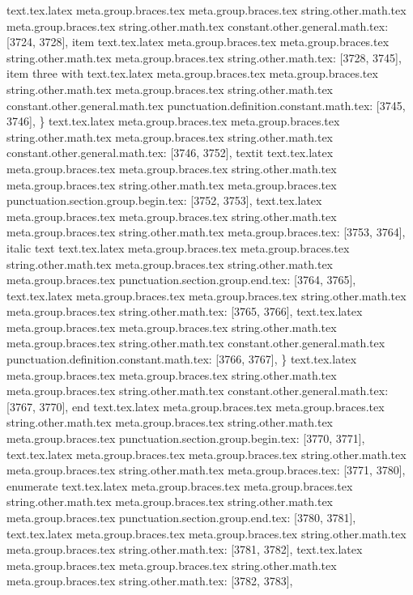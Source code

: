 {{{{{{{{{{{{{{{{{{{{{{{{{{{{{{{{{{{{{{{{{{{{{{{{{{{{{{{{{{{{{{{{{{{{{{{{{{{{{{{{{{{{{{{{{{{{{{{{{{{{{{{{{{{{{{{{{{{{{{text.tex.latex meta.group.braces.tex meta.group.braces.tex string.other.math.tex meta.group.braces.tex string.other.math.tex constant.other.general.math.tex: [3724, 3728], {item}
text.tex.latex meta.group.braces.tex meta.group.braces.tex string.other.math.tex meta.group.braces.tex string.other.math.tex: [3728, 3745], { item three with }
text.tex.latex meta.group.braces.tex meta.group.braces.tex string.other.math.tex meta.group.braces.tex string.other.math.tex constant.other.general.math.tex punctuation.definition.constant.math.tex: [3745, 3746], {\}
text.tex.latex meta.group.braces.tex meta.group.braces.tex string.other.math.tex meta.group.braces.tex string.other.math.tex constant.other.general.math.tex: [3746, 3752], {textit}
text.tex.latex meta.group.braces.tex meta.group.braces.tex string.other.math.tex meta.group.braces.tex string.other.math.tex meta.group.braces.tex punctuation.section.group.begin.tex: [3752, 3753], {{}
text.tex.latex meta.group.braces.tex meta.group.braces.tex string.other.math.tex meta.group.braces.tex string.other.math.tex meta.group.braces.tex: [3753, 3764], {italic text}
text.tex.latex meta.group.braces.tex meta.group.braces.tex string.other.math.tex meta.group.braces.tex string.other.math.tex meta.group.braces.tex punctuation.section.group.end.tex: [3764, 3765], {}}
text.tex.latex meta.group.braces.tex meta.group.braces.tex string.other.math.tex meta.group.braces.tex string.other.math.tex: [3765, 3766], {
}
text.tex.latex meta.group.braces.tex meta.group.braces.tex string.other.math.tex meta.group.braces.tex string.other.math.tex constant.other.general.math.tex punctuation.definition.constant.math.tex: [3766, 3767], {\}
text.tex.latex meta.group.braces.tex meta.group.braces.tex string.other.math.tex meta.group.braces.tex string.other.math.tex constant.other.general.math.tex: [3767, 3770], {end}
text.tex.latex meta.group.braces.tex meta.group.braces.tex string.other.math.tex meta.group.braces.tex string.other.math.tex meta.group.braces.tex punctuation.section.group.begin.tex: [3770, 3771], {{}
text.tex.latex meta.group.braces.tex meta.group.braces.tex string.other.math.tex meta.group.braces.tex string.other.math.tex meta.group.braces.tex: [3771, 3780], {enumerate}
text.tex.latex meta.group.braces.tex meta.group.braces.tex string.other.math.tex meta.group.braces.tex string.other.math.tex meta.group.braces.tex punctuation.section.group.end.tex: [3780, 3781], {}}
text.tex.latex meta.group.braces.tex meta.group.braces.tex string.other.math.tex meta.group.braces.tex string.other.math.tex: [3781, 3782], {
}
text.tex.latex meta.group.braces.tex meta.group.braces.tex string.other.math.tex meta.group.braces.tex string.other.math.tex: [3782, 3783], {
}}}}}}}}}}}}}}}}}}}}}}}}}}}}}}}}}}}}}}}}}}}}}}}}}}}}}}}}}}}}}}}}}}}}}}}}}}}}}}}}}}}}}}}}}}}}}}}}}}}}}}}}}}}}}}}}}}}}}}}}}
